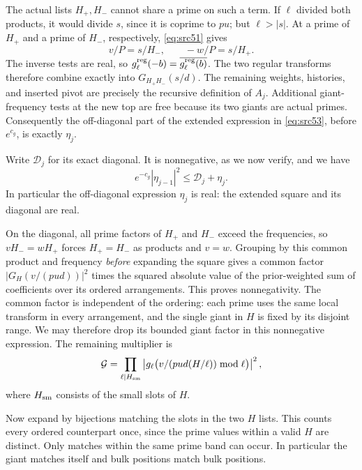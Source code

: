 The actual lists $H_+,H_-$ cannot share a prime on such a term.
If $\ell$ divided both products, it would divide $s$, since it is
coprime to $pu$; but $\ell>|s|$.  At a prime of $H_+$ and a prime
of $H_-$, respectively, \eqref{eq:src51} gives
\[
                 v/P=s/H_-,\qquad -w/P=s/H_+.
\]
The inverse tests are real, so
$g_\ell^{\rm reg}(-b)=\overline{g_\ell^{\rm reg}(b)}$.
The two regular transforms therefore combine exactly into
$G_{H_+H_-}(s/d)$.  The remaining weights, histories, and inserted
pivot are precisely the recursive definition of $A_j$.
Additional giant-frequency tests at the new top are free because
its two giants are actual primes.  Consequently the off-diagonal
part of the extended expression in \eqref{eq:src53}, before
$e^{c_g}$, is exactly $\eta_j$.

Write $\mathcal D_j$ for its exact diagonal.  It is nonnegative, as
we now verify, and we have
\begin{equation}
                e^{-c_g}|\eta_{j-1}|^2
                         \le\mathcal D_j+\eta_j.
 \label{eq:construction-transfer-split}
\end{equation}
In particular the off-diagonal expression $\eta_j$ is real: the
extended square and its diagonal are real.

On the diagonal, all prime factors of $H_+$ and $H_-$ exceed the
frequencies, so $vH_-=wH_+$ forces $H_+=H_-$ as products and
$v=w$.  Grouping by this common product and frequency \emph{before}
expanding the square gives a common factor
$|G_H(v/(pud))|^2$ times the squared absolute value of the
prior-weighted sum of coefficients over its ordered arrangements.
This proves nonnegativity.  The common factor is independent of the
ordering: each prime uses the same local transform in every
arrangement, and the single giant in $H$ is fixed by its disjoint
range.  We may therefore drop its bounded giant factor in this
nonnegative expression.  The remaining multiplier is
\begin{equation}
 \mathcal G=\prod_{\ell\mid H_{\rm sm}}
       \left|g_\ell\bigl(v/(pud(H/\ell))\bmod\ell\bigr)\right|^2,
 \label{eq:src54}
\end{equation}
where $H_{\rm sm}$ consists of the small slots of $H$.

Now expand by bijections matching the slots in the two $H$ lists.
This counts every ordered counterpart once, since the prime values
within a valid $H$ are distinct.  Only matches within the same
prime band can occur.  In particular the giant matches itself and
bulk positions match bulk positions.

